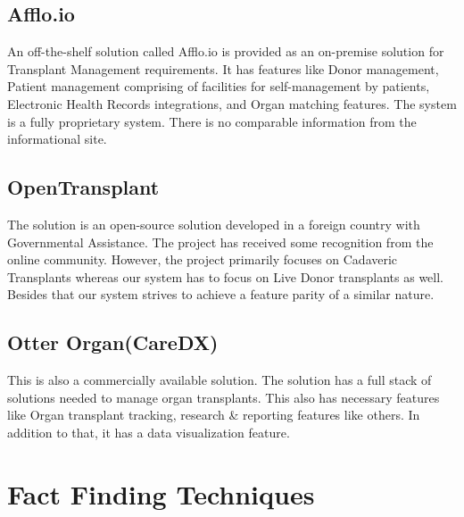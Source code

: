 \documentclass[12pt,a4paper]{report}
\begin{document}
\subsection{Afflo.io}
An off-the-shelf solution called Afflo.io is provided as an on-premise solution for Transplant Management requirements. It has features like Donor management, Patient management comprising of facilities for self-management by patients, Electronic Health Records integrations, and Organ matching features. The system is a fully proprietary system. There is no comparable information from the informational site.  \cite{afflo}


\subsection{OpenTransplant}
The solution is an open-source solution developed in a foreign country with Governmental Assistance. The project has received some recognition from the online community. However, the project primarily focuses on Cadaveric Transplants whereas our system has to focus on Live Donor transplants as well. Besides that our system strives to achieve a feature parity of a similar nature.\cite{opentransplant}

\subsection{Otter Organ(CareDX)}

This is also a commercially available solution. The solution has a full stack of solutions needed to manage organ transplants. This also has necessary features like Organ transplant tracking, research \& reporting features like others. In addition to that, it has a data visualization feature. \cite{otter}



\section{Fact Finding Techniques}
\end{document}

